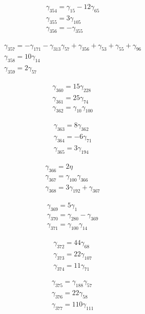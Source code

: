 \[\begin{aligned}\gamma_{354}=\gamma_{15} - 12 \gamma_{65}\\ \gamma_{355}=3 \gamma_{105}\\ \gamma_{356}=- \gamma_{355}\end{aligned}\]

\[\begin{aligned}\gamma_{357}=- \gamma_{171} - \gamma_{313} \gamma_{57} + \gamma_{356} + \gamma_{53} + \gamma_{55} + \gamma_{96}\\ \gamma_{358}=10 \gamma_{14}\\ \gamma_{359}=2 \gamma_{57}\end{aligned}\]

\[\begin{aligned}\gamma_{360}=15 \gamma_{228}\\ \gamma_{361}=25 \gamma_{74}\\ \gamma_{362}=\gamma_{10} \gamma_{100}\end{aligned}\]

\[\begin{aligned}\gamma_{363}=8 \gamma_{362}\\ \gamma_{364}=- 6 \gamma_{71}\\ \gamma_{365}=3 \gamma_{194}\end{aligned}\]

\[\begin{aligned}\gamma_{366}=2 \eta \\ \gamma_{367}=\gamma_{100} \gamma_{366}\\ \gamma_{368}=3 \gamma_{192} + \gamma_{367}\end{aligned}\]

\[\begin{aligned}\gamma_{369}=5 \gamma_{1}\\ \gamma_{370}=\gamma_{280} - \gamma_{369}\\ \gamma_{371}=\gamma_{100} \gamma_{14}\end{aligned}\]

\[\begin{aligned}\gamma_{372}=44 \gamma_{68}\\ \gamma_{373}=22 \gamma_{107}\\ \gamma_{374}=11 \gamma_{71}\end{aligned}\]

\[\begin{aligned}\gamma_{375}=\gamma_{188} \gamma_{57}\\ \gamma_{376}=22 \gamma_{58}\\ \gamma_{377}=110 \gamma_{111}\end{aligned}\]

